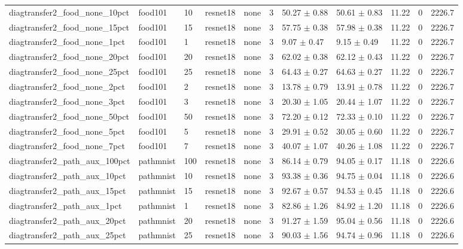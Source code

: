 \begin{tabular}{lllllllllll}
diagtransfer2_food_none_10pct & food101 & 10 & resnet18 & none & 3 & 50.27 $\pm$ 0.88 & 50.61 $\pm$ 0.83 & 11.22 & 0 & 2226.7 \\
diagtransfer2_food_none_15pct & food101 & 15 & resnet18 & none & 3 & 57.75 $\pm$ 0.38 & 57.98 $\pm$ 0.38 & 11.22 & 0 & 2226.7 \\
diagtransfer2_food_none_1pct & food101 & 1 & resnet18 & none & 3 & 9.07 $\pm$ 0.47 & 9.15 $\pm$ 0.49 & 11.22 & 0 & 2226.7 \\
diagtransfer2_food_none_20pct & food101 & 20 & resnet18 & none & 3 & 62.02 $\pm$ 0.38 & 62.12 $\pm$ 0.43 & 11.22 & 0 & 2226.7 \\
diagtransfer2_food_none_25pct & food101 & 25 & resnet18 & none & 3 & 64.43 $\pm$ 0.27 & 64.63 $\pm$ 0.27 & 11.22 & 0 & 2226.7 \\
diagtransfer2_food_none_2pct & food101 & 2 & resnet18 & none & 3 & 13.78 $\pm$ 0.79 & 13.91 $\pm$ 0.78 & 11.22 & 0 & 2226.7 \\
diagtransfer2_food_none_3pct & food101 & 3 & resnet18 & none & 3 & 20.30 $\pm$ 1.05 & 20.44 $\pm$ 1.07 & 11.22 & 0 & 2226.7 \\
diagtransfer2_food_none_50pct & food101 & 50 & resnet18 & none & 3 & 72.20 $\pm$ 0.12 & 72.33 $\pm$ 0.10 & 11.22 & 0 & 2226.7 \\
diagtransfer2_food_none_5pct & food101 & 5 & resnet18 & none & 3 & 29.91 $\pm$ 0.52 & 30.05 $\pm$ 0.60 & 11.22 & 0 & 2226.7 \\
diagtransfer2_food_none_7pct & food101 & 7 & resnet18 & none & 3 & 40.07 $\pm$ 1.07 & 40.26 $\pm$ 1.08 & 11.22 & 0 & 2226.7 \\
diagtransfer2_path_aux_100pct & pathmnist & 100 & resnet18 & none & 3 & 86.14 $\pm$ 0.79 & 94.05 $\pm$ 0.17 & 11.18 & 0 & 2226.6 \\
diagtransfer2_path_aux_10pct & pathmnist & 10 & resnet18 & none & 3 & 93.38 $\pm$ 0.36 & 94.75 $\pm$ 0.04 & 11.18 & 0 & 2226.6 \\
diagtransfer2_path_aux_15pct & pathmnist & 15 & resnet18 & none & 3 & 92.67 $\pm$ 0.57 & 94.53 $\pm$ 0.45 & 11.18 & 0 & 2226.6 \\
diagtransfer2_path_aux_1pct & pathmnist & 1 & resnet18 & none & 3 & 82.86 $\pm$ 1.26 & 84.92 $\pm$ 1.20 & 11.18 & 0 & 2226.6 \\
diagtransfer2_path_aux_20pct & pathmnist & 20 & resnet18 & none & 3 & 91.27 $\pm$ 1.59 & 95.04 $\pm$ 0.56 & 11.18 & 0 & 2226.6 \\
diagtransfer2_path_aux_25pct & pathmnist & 25 & resnet18 & none & 3 & 90.03 $\pm$ 1.56 & 94.74 $\pm$ 0.96 & 11.18 & 0 & 2226.6 \\

\end{tabular}
